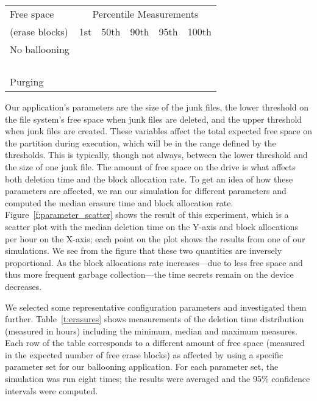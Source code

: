 \documentclass{acmtog}
\begin{document}
\begin{table*}[t]
\centering
\begin{tabular}{lrrrrr}
\hline
Free space   & \multicolumn{5}{c}{Percentile Measurements} \\
(erase  blocks)  & 1st & 50th & 90th & 95th & 100th \\ 
\hline
No ballooning  &  &  &  &  &  \\


 &  &  &  &  &  \\ 

 &  &  &  &  &  \\



 &  &  &  &  &  \\ 

 &  &  &  &  &  \\ 
Purging &  &  &  &  &  \\

\hline

\end{tabular}
\caption{\small Deletion time in hours for different configuration parameters.
\label{t:erasures}\normalsize}
\end{table*}

Our application's parameters are the size of the junk files, the lower
threshold on the file system's free space when junk files are deleted, and the
upper threshold when junk files are created. 
These variables affect the total
expected free space on the partition during execution, which will be in the
range defined by the thresholds. This is typically, though not always, between the lower threshold and
the size of one junk file. The amount of free space on the drive is what
affects both deletion time and the block allocation rate. To get an idea of
how these parameters are affected, we ran our simulation for different
parameters and computed the median erasure time and block allocation rate.
Figure~\ref{f:parameter_scatter} shows the result of this experiment, which is
a scatter plot with the median deletion time on the Y-axis and block allocations
per hour on the X-axis; each point on the plot shows the results from one of our
simulations. We see from the figure that these two quantities
are inversely proportional. As the block allocations rate
increases---due to less free space and thus more frequent garbage
collection---the time secrets remain on the device decreases. 

We selected some representative configuration parameters and investigated them further.
Table~\ref{t:erasures} shows measurements of the deletion time distribution
(measured in hours) including the minimum, median and maximum measures. 
Each row of the table corresponds to a different amount of
free space (measured in the expected number of free erase blocks) as
affected by using a specific parameter set for our ballooning application. 
For each parameter set, the simulation was run eight times; the results were averaged and 
the 95\% confidence intervals were computed. 
\end{document}
